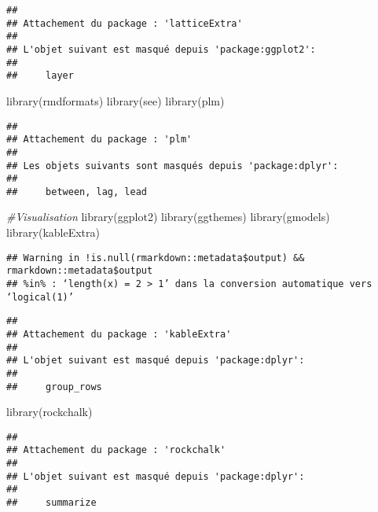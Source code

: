 \documentclass[
]{article}
\newenvironment{Shaded}{\begin{snugshade}}{\end{snugshade}}
\newcommand{\CommentTok}[1]{\textcolor[rgb]{0.56,0.35,0.01}{\textit{#1}}}
\newcommand{\FunctionTok}[1]{\textcolor[rgb]{0.00,0.00,0.00}{#1}}
\newcommand{\NormalTok}[1]{#1}
\begin{document}
\begin{verbatim}
## 
## Attachement du package : 'latticeExtra'
## 
## L'objet suivant est masqué depuis 'package:ggplot2':
## 
##     layer
\end{verbatim}

\begin{Shaded}
\begin{Highlighting}[]
\FunctionTok{library}\NormalTok{(rmdformats)}
\FunctionTok{library}\NormalTok{(see)}
\FunctionTok{library}\NormalTok{(plm)}
\end{Highlighting}
\end{Shaded}

\begin{verbatim}
## 
## Attachement du package : 'plm'
## 
## Les objets suivants sont masqués depuis 'package:dplyr':
## 
##     between, lag, lead
\end{verbatim}

\begin{Shaded}
\begin{Highlighting}[]
\CommentTok{\#Visualisation}
\FunctionTok{library}\NormalTok{(ggplot2)}
\FunctionTok{library}\NormalTok{(ggthemes)}
\FunctionTok{library}\NormalTok{(gmodels)}
\FunctionTok{library}\NormalTok{(kableExtra)}
\end{Highlighting}
\end{Shaded}

\begin{verbatim}
## Warning in !is.null(rmarkdown::metadata$output) && rmarkdown::metadata$output
## %in% : ‘length(x) = 2 > 1’ dans la conversion automatique vers ‘logical(1)’
\end{verbatim}

\begin{verbatim}
## 
## Attachement du package : 'kableExtra'
## 
## L'objet suivant est masqué depuis 'package:dplyr':
## 
##     group_rows
\end{verbatim}

\begin{Shaded}
\begin{Highlighting}[]
\FunctionTok{library}\NormalTok{(rockchalk)}
\end{Highlighting}
\end{Shaded}

\begin{verbatim}
## 
## Attachement du package : 'rockchalk'
## 
## L'objet suivant est masqué depuis 'package:dplyr':
## 
##     summarize
\end{verbatim}
\end{document}
